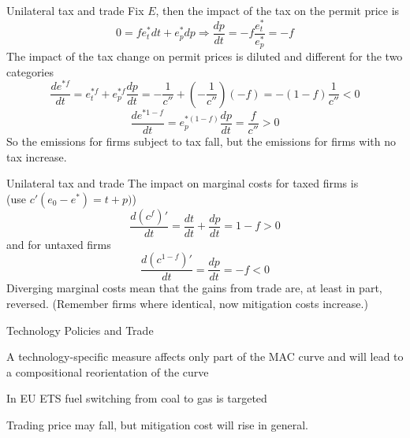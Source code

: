 



{Unilateral tax and trade}
Fix $E$, then the impact of the tax on the permit price is
\[
0 =  fe^*_tdt+e^*_pdp \Rightarrow \frac{dp}{dt} = -f \frac{e^*_t}{e^*_p} = -f
\]
The impact of the tax change on permit prices is diluted and different for the two categories
\[
\frac{de^{*f}}{dt} = e^{*f}_t + e^{*f}_p \frac{dp}{dt} = -\frac{1}{c''} + (-\frac{1}{c''})(-f) = -(1-f)\frac{1}{c''} < 0
\]
\[
\frac{de^{*1-f}}{dt} = e^{*(1-f)}_p\frac{dp}{dt} = \frac{f}{c''} > 0
\]
So the emissions for firms subject to tax fall, but the emissions for firms with no tax increase.


{Unilateral tax and trade}
The impact on marginal costs for taxed firms is \\
(use $c'(e_0-e^*) = t+p)$)
\[
\frac{d(c^f)'}{dt} = \frac{dt}{dt} + \frac{dp}{dt} = 1-f > 0
\]
and for untaxed firms
\[
\frac{d(c^{1-f})'}{dt} = \frac{dp}{dt} = -f < 0
\]
Diverging marginal costs mean that the gains from trade are, at least in part, reversed. (Remember firms where identical, now mitigation costs increase.)


{Technology Policies and Trade}






	A technology-specific measure affects only part of the MAC curve and will lead to a compositional reorientation of the curve


	In EU ETS fuel switching from coal to gas is targeted


	Trading price may fall, but mitigation cost will rise in general.





